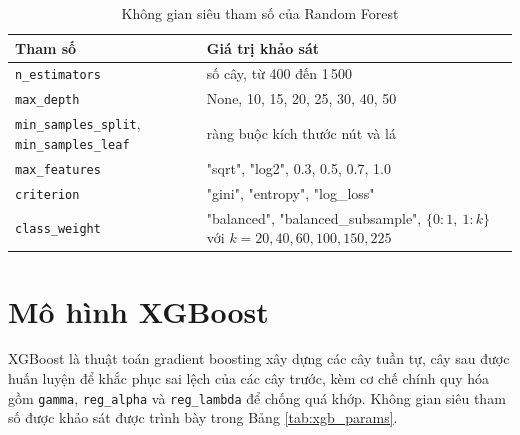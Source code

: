 \begin{table}[H]
\centering
\fontsize{11}{13.6}\selectfont
\renewcommand{\arraystretch}{1.2}
\setlength{\tabcolsep}{6pt}
\begin{tabularx}{\textwidth}{|p{4.8cm}|X|}
\hline
\textbf{Tham số} & \textbf{Giá trị khảo sát} \\
\hline
\texttt{n\_estimators} & số cây, từ 400 đến 1\,500 \\
\hline
\texttt{max\_depth} & None, 10, 15, 20, 25, 30, 40, 50 \\
\hline
\texttt{min\_samples\_split}, \texttt{min\_samples\_leaf} & ràng buộc kích thước nút và lá \\
\hline
\texttt{max\_features} & "sqrt", "log2", 0{.}3, 0{.}5, 0{.}7, 1{.}0 \\
\hline
\texttt{criterion} & "gini", "entropy", "log\_loss" \\
\hline
\texttt{class\_weight} & "balanced", "balanced\_subsample", $\{0{:}1,\ 1{:}k\}$ với $k = 20, 40, 60, 100, 150, 225$ \\
\hline
\end{tabularx}
\caption{Không gian siêu tham số của Random Forest}
\label{tab:rf_params}
\end{table}

\section{Mô hình XGBoost}
XGBoost \cite{chen2016xgboost} là thuật toán gradient boosting xây dựng các cây tuần tự, cây sau được huấn luyện để khắc phục sai lệch của các cây trước, kèm cơ chế chính quy hóa gồm \texttt{gamma}, \texttt{reg\_alpha} và \texttt{reg\_lambda} để chống quá khớp. Không gian siêu tham số được khảo sát được trình bày trong Bảng \ref{tab:xgb_params}.

